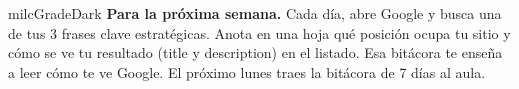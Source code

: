 \documentclass[11pt,letterpaper]{article}
\begin{document}
\begin{infoband}{milcGradeDark}
\textbf{Para la próxima semana.} Cada día, abre Google y busca una de tus 3 frases clave estratégicas. Anota en una hoja qué posición ocupa tu sitio y cómo se ve tu resultado (title y description) en el listado. Esa bitácora te enseña a leer cómo te ve Google. El próximo lunes traes la bitácora de 7 días al aula.
\end{infoband}
\end{document}
